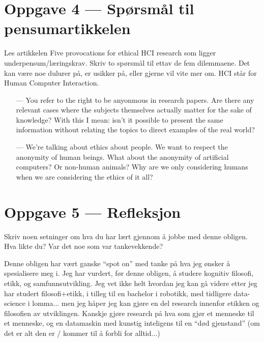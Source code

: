 \documentclass{../../myassignment}
\begin{document}
\section*{Oppgave 4 --- Spørsmål til pensumartikkelen}
	\begin{problem}
		Les artikkelen Five provocations for ethical HCI research som ligger underpensum/læringskrav. Skriv to spørsmål til  ettav de fem dilemmaene. Det kan være noe dulurer på, er usikker på, eller gjerne vil vite mer om. HCI står for Human Computer Interaction.
	\end{problem}
	\begin{answer}
		\begin{itemize}
			\item [---] You refer to the right to be anyonmous in research papers. Are there any relevant cases where the subjects themselves actually matter for the sake of knowledge? With this I mean: isn't it possible to present the same information without relating the topics to direct examples of the real world?
			\item [---] We're talking about ethics about people. We want to respect the anonymity of human beings. What about the anonymity of artificial computers? Or non-human animals? Why are we only considering humans when we are considering the ethics of it all?
		\end{itemize}
	\end{answer}


\section*{Oppgave 5 --- Refleksjon}
	\begin{problem}
		Skriv noen setninger om hva du har lært gjennom å jobbe med denne obligen. Hva likte du? Var det noe som var tankevekkende?
	\end{problem}

	\begin{answer}
		Denne obligen har vært ganske ``spot on'' med tanke på hva jeg ønsker å spesialisere meg i. Jeg har vurdert, før denne obligen, å studere kognitiv filosofi, etikk, og samfunnsutvikling. Jeg vet ikke helt hvordan jeg kan gå videre etter jeg har studert filosofi+etikk, i tilleg til en bachelor i robotikk, med tidligere data-science i lomma... men jeg håper jeg kan gjøre en del research innenfor etikken og filosofien av utviklingen. Kanskje gjøre research på hva som gjør et menneske til et menneske, og en datamaskin med kunstig inteligens til en ``død gjenstand'' (om det er alt den er / kommer til å forbli for alltid...)

	\end{answer}
\end{document}
